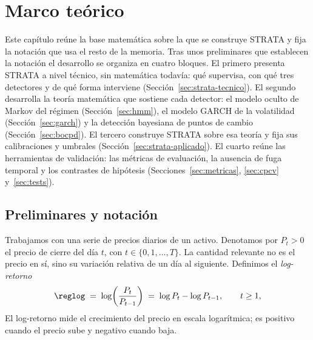 \chapter{Marco teórico}
\label{cap:marco-teorico}


Este capítulo reúne la base matemática sobre la que se construye STRATA y fija la notación que usa el resto de la memoria. Tras unos preliminares que establecen la notación el desarrollo se organiza en cuatro bloques. El primero presenta STRATA a nivel técnico, sin matemática todavía: qué supervisa, con qué tres detectores y de qué forma interviene (Sección~\ref{sec:strata-tecnico}). El segundo desarrolla la teoría matemática que sostiene cada detector: el modelo oculto de Markov del régimen (Sección~\ref{sec:hmm}), el modelo GARCH de la volatilidad (Sección~\ref{sec:garch}) y la detección bayesiana de puntos de cambio (Sección~\ref{sec:bocpd}). El tercero construye STRATA sobre esa teoría y fija sus calibraciones y umbrales (Sección~\ref{sec:strata-aplicado}). El cuarto reúne las herramientas de validación: las métricas de evaluación, la ausencia de fuga temporal y los contrastes de hipótesis (Secciones~\ref{sec:metricas}, \ref{sec:cpcv} y~\ref{sec:tests}). 

\section{Preliminares y notación}
\label{sec:preliminares}

Trabajamos con una serie de precios diarios de un activo. Denotamos por $P_t > 0$ el precio de cierre del día $t$, con $t \in \{0, 1, \dots, T\}$. La cantidad relevante no es el precio en sí, sino su variación relativa de un día al siguiente. Definimos el \emph{log-retorno}
\[
\reglog \;=\; \log\!\left(\frac{P_t}{P_{t-1}}\right) \;=\; \log P_t - \log P_{t-1}, \qquad t \ge 1,
\]
El log-retorno mide el crecimiento del precio en escala logarítmica; es positivo cuando el precio sube y negativo cuando baja.

